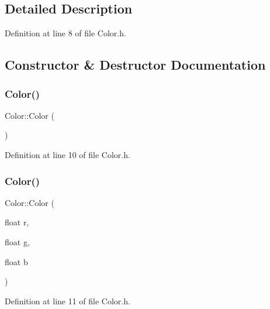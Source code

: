 \subsection{Detailed Description}


Definition at line 8 of file Color.\+h.



\subsection{Constructor \& Destructor Documentation}
\mbox{\label{struct_color_a9a742cbe9f9f4037f5d9f4e81a9b2428}} 
\subsubsection{\texorpdfstring{Color()}{Color()}\hspace{0.1cm}{\footnotesize\ttfamily [1/3]}}
{\footnotesize\ttfamily Color\+::\+Color (\begin{DoxyParamCaption}{ }\end{DoxyParamCaption})\hspace{0.3cm}{\ttfamily [inline]}}



Definition at line 10 of file Color.\+h.

\mbox{\label{struct_color_a373c542c99fb83ce9c7c08aae76b2718}} 
\subsubsection{\texorpdfstring{Color()}{Color()}\hspace{0.1cm}{\footnotesize\ttfamily [2/3]}}
{\footnotesize\ttfamily Color\+::\+Color (\begin{DoxyParamCaption}\item[{float}]{r,  }\item[{float}]{g,  }\item[{float}]{b }\end{DoxyParamCaption})\hspace{0.3cm}{\ttfamily [inline]}}



Definition at line 11 of file Color.\+h.

\mbox{\label{struct_color_a6e4627389673c8b5cce81bf3eec79938}} 
